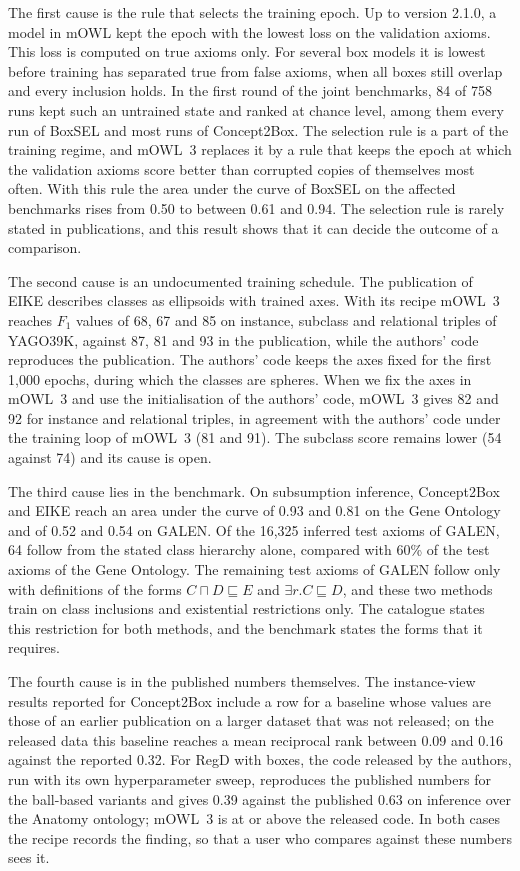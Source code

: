 \documentclass[runningheads]{llncs}
\begin{document}
The first cause is the rule that selects the training epoch. Up to version 2.1.0, a
model in mOWL kept the epoch with the lowest loss on the validation axioms. This loss is
computed on true axioms only. For several box models it is lowest before training has
separated true from false axioms, when all boxes still overlap and every inclusion holds.
In the first round of the joint benchmarks, 84 of 758 runs kept such an untrained state
and ranked at chance level, among them every run of BoxSEL and most runs of Concept2Box.
The selection rule is a part of the training regime, and mOWL~3 replaces it by a rule
that keeps the epoch at which the validation axioms score better than corrupted copies of
themselves most often. With this rule the area under the curve of BoxSEL on the affected
benchmarks rises from 0.50 to between 0.61 and 0.94. The selection rule is rarely stated
in publications, and this result shows that it can decide the outcome of a comparison.

The second cause is an undocumented training schedule. The publication of EIKE describes
classes as ellipsoids with trained axes. With its recipe mOWL~3 reaches $F_1$ values of 68,
67 and 85 on instance, subclass and relational triples of YAGO39K, against 87, 81 and 93
in the publication, while the authors' code reproduces the publication. The authors' code
keeps the axes fixed for the first 1,000 epochs, during which the classes are spheres.
When we fix the axes in mOWL~3 and use the initialisation of the authors' code, mOWL~3
gives 82 and 92 for instance and relational triples, in agreement with the authors' code
under the training loop of mOWL~3 (81 and 91). The subclass score remains lower (54
against 74) and its cause is open.

The third cause lies in the benchmark. On subsumption inference, Concept2Box and EIKE
reach an area under the curve of 0.93 and 0.81 on the Gene Ontology and of 0.52 and 0.54
on GALEN. Of the 16,325 inferred
test axioms of GALEN, 64 follow from the stated class hierarchy alone, compared with 60\%
of the test axioms of the Gene Ontology. The remaining test axioms of GALEN follow only
with definitions of the forms $C \sqcap D \sqsubseteq E$ and
$\exists r.C \sqsubseteq D$, and these two methods train on class inclusions and
existential restrictions only. The catalogue states this restriction for both methods,
and the benchmark states the forms that it requires.

The fourth cause is in the published numbers themselves. The instance-view results
reported for Concept2Box include a row for a baseline whose values are those of an
earlier publication on a larger dataset that was not released; on the released data this
baseline reaches a mean reciprocal rank between 0.09 and 0.16 against the reported 0.32.
For RegD with boxes, the code released by the authors, run with its own hyperparameter
sweep, reproduces the published numbers for the ball-based variants and gives 0.39
against the published 0.63 on inference over the Anatomy ontology; mOWL~3 is at or above
the released code. In both cases the recipe records the finding, so that a user who
compares against these numbers sees it.
\end{document}

